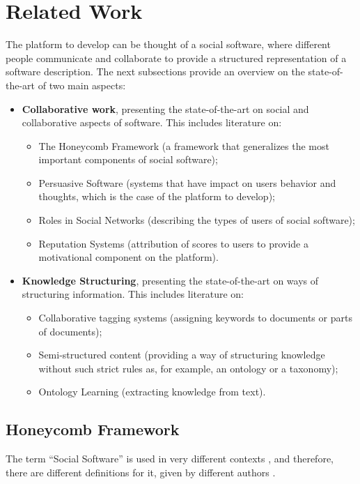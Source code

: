 
\chapter{Related Work}
\label{chapter:relatedwork}
\label{related}
The platform to develop can be thought of a social software, where different people communicate and collaborate to provide a structured representation of a software description.
The next subsections provide an overview on the state-of-the-art of two main aspects:
\begin{itemize}
\item \textbf{Collaborative work}, presenting the state-of-the-art on social and collaborative aspects of software. This includes literature on:
	\begin{itemize}
		\item The Honeycomb Framework (a framework that generalizes the most important components of social software);
		\item Persuasive Software (systems that have impact on users behavior and thoughts, which is the case of the platform to develop);
		\item Roles in Social Networks (describing the types of users of social software);
		\item Reputation Systems (attribution of scores to users to provide a motivational component on the platform).
	\end{itemize}
	
\item \textbf{Knowledge Structuring}, presenting the state-of-the-art on ways of structuring information. This includes literature on:
	\begin{itemize}
		\item Collaborative tagging systems (assigning keywords to documents or parts of documents);
		\item Semi-structured content (providing a way of structuring knowledge without such strict rules as, for example, an ontology or a taxonomy);
		\item Ontology Learning (extracting knowledge from text).
	\end{itemize} 
\end{itemize}


\section{Honeycomb Framework}
The term ``Social Software'' is used in very different contexts \cite{pereira2010social}, and therefore, there are different definitions for it, given by different authors \cite{shirky2005group,klamma2007social,kolko2007mobile,wiley2008tagging,chatti2007future}. 


